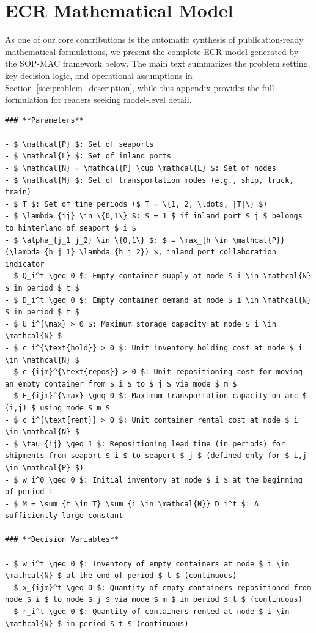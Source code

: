 \documentclass[preprint,12pt]{elsarticle}
\begin{document}
\section{ECR Mathematical Model}\label{app3}
As one of our core contributions is the automatic synthesis of publication-ready mathematical formulations, we present the complete ECR model generated by the SOP-MAC framework below. The main text summarizes the problem setting, key decision logic, and operational assumptions in Section~\ref{sec:problem_description}, while this appendix provides the full formulation for readers seeking model-level detail.
\begin{nolinenumbers}
\begin{promptbox}
\begin{lstlisting}[style=prompttemplate]
### **Parameters**

- $ \mathcal{P} $: Set of seaports
- $ \mathcal{L} $: Set of inland ports
- $ \mathcal{N} = \mathcal{P} \cup \mathcal{L} $: Set of nodes
- $ \mathcal{M} $: Set of transportation modes (e.g., ship, truck, train)
- $ T $: Set of time periods ($ T = \{1, 2, \ldots, |T|\} $)
- $ \lambda_{ij} \in \{0,1\} $: $ = 1 $ if inland port $ j $ belongs to hinterland of seaport $ i $
- $ \alpha_{j_1 j_2} \in \{0,1\} $: $ = \max_{h \in \mathcal{P}} (\lambda_{h j_1} \lambda_{h j_2}) $, inland port collaboration indicator
- $ Q_i^t \geq 0 $: Empty container supply at node $ i \in \mathcal{N} $ in period $ t $
- $ D_i^t \geq 0 $: Empty container demand at node $ i \in \mathcal{N} $ in period $ t $
- $ U_i^{\max} > 0 $: Maximum storage capacity at node $ i \in \mathcal{N} $
- $ c_i^{\text{hold}} > 0 $: Unit inventory holding cost at node $ i \in \mathcal{N} $
- $ c_{ijm}^{\text{repos}} > 0 $: Unit repositioning cost for moving an empty container from $ i $ to $ j $ via mode $ m $
- $ F_{ijm}^{\max} \geq 0 $: Maximum transportation capacity on arc $ (i,j) $ using mode $ m $
- $ c_i^{\text{rent}} > 0 $: Unit container rental cost at node $ i \in \mathcal{N} $
- $ \tau_{ij} \geq 1 $: Repositioning lead time (in periods) for shipments from seaport $ i $ to seaport $ j $ (defined only for $ i,j \in \mathcal{P} $)
- $ w_i^0 \geq 0 $: Initial inventory at node $ i $ at the beginning of period 1
- $ M = \sum_{t \in T} \sum_{i \in \mathcal{N}} D_i^t $: A sufficiently large constant

### **Decision Variables**

- $ w_i^t \geq 0 $: Inventory of empty containers at node $ i \in \mathcal{N} $ at the end of period $ t $ (continuous)
- $ x_{ijm}^t \geq 0 $: Quantity of empty containers repositioned from node $ i $ to node $ j $ via mode $ m $ in period $ t $ (continuous)
- $ r_i^t \geq 0 $: Quantity of containers rented at node $ i \in \mathcal{N} $ in period $ t $ (continuous)


\end{lstlisting}
\end{promptbox}
\end{nolinenumbers}
\end{document}
